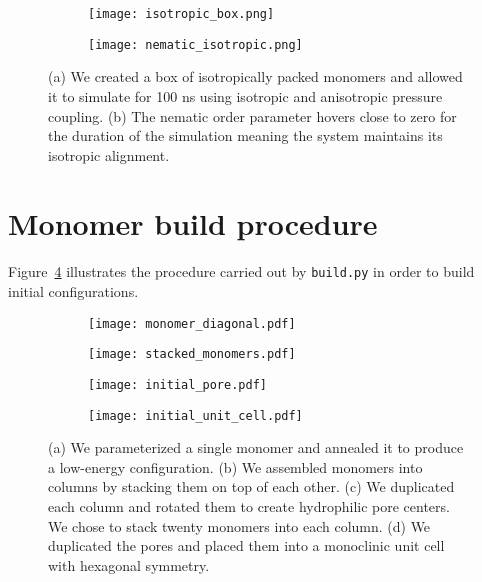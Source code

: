   \begin{figure}[!htb]
  \centering
  \begin{subfigure}{0.45\textwidth}
  \texttt{[image: isotropic\_box.png]}
  \caption{}\label{S-fig:isotropic_box}
  \end{subfigure}
  \begin{subfigure}{0.45\textwidth}
  \texttt{[image: nematic\_isotropic.png]}
  \caption{}\label{S-fig:nematic_isotropic}
  \end{subfigure}
  \caption{(a) We created a box of isotropically packed monomers and allowed it to simulate
  for 100 ns using isotropic and anisotropic pressure coupling. (b) The nematic order 
  parameter hovers close to zero for the duration of the simulation meaning the system
  maintains its isotropic alignment.}\label{S-fig:self_assembly}
  \end{figure}
  
  \clearpage  
  
  \section{Monomer build procedure}\label{S-section:monomer_build_procedure}
  
  Figure~\ref{S-fig:build_procedure} illustrates the procedure carried out by 
  \texttt{build.py} in order to build initial configurations.  
  
  \begin{figure}[!htb]
  \centering
  \begin{subfigure}[t]{0.45\textwidth}
  \texttt{[image: monomer\_diagonal.pdf]}
  \caption{}
  \end{subfigure}
  \begin{subfigure}[t]{0.42\textwidth}
  \texttt{[image: stacked\_monomers.pdf]}
  \caption{}
  \end{subfigure}
  \begin{subfigure}[t]{0.35\textwidth}
  \texttt{[image: initial\_pore.pdf]}
  \caption{}
  \end{subfigure}
  \begin{subfigure}[t]{0.45\textwidth}
  \texttt{[image: initial\_unit\_cell.pdf]}
  \caption{}
  \end{subfigure}
  \caption{(a) We parameterized a single monomer and annealed it to produce a low-energy
		configuration. (b) We assembled monomers into columns by stacking them on top of each 
		other. (c) We duplicated each column and rotated them to create hydrophilic pore centers.
		We chose to stack twenty monomers into each column. (d) We duplicated the pores and 
		placed them into a monoclinic unit cell with hexagonal symmetry.}\label{S-fig:build_procedure}
  \end{figure}

